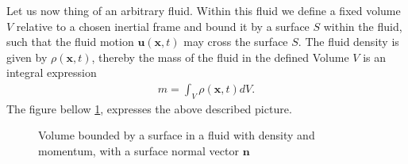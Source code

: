 Let us now thing of an arbitrary fluid. Within this fluid we define a fixed
volume $V$ relative to a chosen inertial frame and bound it by a surface $S$
within the fluid, such that the fluid motion $\mathbf{u}(\mathbf{x}, t)$ may
cross the surface $S$. The fluid density is given by $\rho(\mathbf{x}, t)$,
thereby the mass of the fluid in the defined Volume $V$ is an integral
expression
\begin{align}
    m = \int_V \rho(\mathbf{x}, t) dV.
\end{align}
The figure bellow \ref{fig:volume}, expresses the above described picture.
\begin{figure}[H]
    \centering
  \caption{Volume bounded by a surface in a fluid with density and momentum,
  with a surface normal vector $\mathbf{n}$ \label{fig:volume}}
\end{figure}

